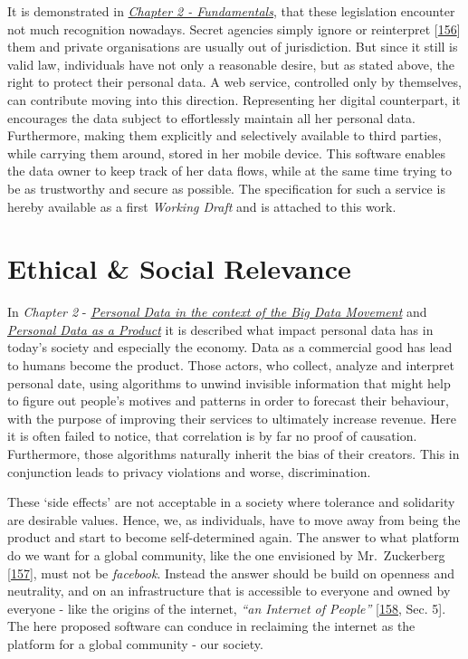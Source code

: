 \documentclass[12pt,english,a4paper,titlepage,cleardoublepage=empty,dottedtoc]{report}
\begin{document}
It is demonstrated in \emph{\protect\hyperlink{fundamentals}{Chapter 2 -
Fundamentals}}, that these legislation encounter not much recognition
nowadays. Secret agencies simply ignore or reinterpret
{[}\protect\hyperlink{ref-web_2016_bnd-weltraumtheorie}{156}{]} them and
private organisations are usually out of jurisdiction. But since it
still is valid law, individuals have not only a reasonable desire, but
as stated above, the right to protect their personal data. A web
service, controlled only by themselves, can contribute moving into this
direction. Representing her digital counterpart, it encourages the data
subject to effortlessly maintain all her personal data. Furthermore,
making them explicitly and selectively available to third parties, while
carrying them around, stored in her mobile device. This software enables
the data owner to keep track of her data flows, while at the same time
trying to be as trustworthy and secure as possible. The specification
for such a service is hereby available as a first \emph{Working Draft}
and is attached to this work.

\section{Ethical \& Social Relevance}\label{ethical-social-relevance}

In \emph{Chapter 2} -
\emph{\protect\hyperlink{personal-data-in-the-context-of-the-big-data-movement}{Personal
Data in the context of the Big Data Movement}} and
\emph{\protect\hyperlink{personal-data-as-a-product}{Personal Data as a
Product}} it is described what impact personal data has in today's
society and especially the economy. Data as a commercial good has lead
to humans become the product. Those actors, who collect, analyze and
interpret personal date, using algorithms to unwind invisible
information that might help to figure out people's motives and patterns
in order to forecast their behaviour, with the purpose of improving
their services to ultimately increase revenue. Here it is often failed
to notice, that correlation is by far no proof of causation.
Furthermore, those algorithms naturally inherit the bias of their
creators. This in conjunction leads to privacy violations and worse,
discrimination.

These `side effects' are not acceptable in a society where tolerance and
solidarity are desirable values. Hence, we, as individuals, have to move
away from being the product and start to become self-determined again.
The answer to what platform do we want for a global community, like the
one envisioned by Mr.~Zuckerberg
{[}\protect\hyperlink{ref-web_2017_facebook_building-global-community}{157}{]},
must not be \emph{facebook}. Instead the answer should be build on
openness and neutrality, and on an infrastructure that is accessible to
everyone and owned by everyone - like the origins of the internet,
\emph{``an Internet of People''}
{[}\protect\hyperlink{ref-web_2017_encouraging-individual-sovereignty}{158},
Sec. 5{]}. The here proposed software can conduce in reclaiming the
internet as the platform for a global community - our society.
\end{document}
